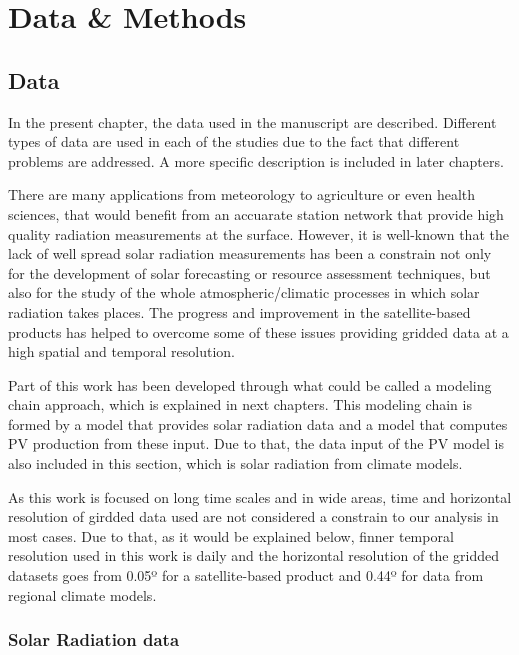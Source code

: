 \part{Data \& Methods\label{cha:datamethods}}

  
\chapter{Data\label{cha:Data}}

  In the present chapter, the data used in the manuscript are described. Different types of data are used in each of the studies due to the fact that different problems are addressed. A more specific description is included in later chapters.

  There are many applications from meteorology to agriculture or even health sciences, that would benefit from an accuarate station network that provide high quality radiation measurements at the surface. However, it is well-known that the lack of  well spread solar radiation measurements has been a constrain not only for the development of solar forecasting or resource assessment techniques, but also for the study of the whole atmospheric/climatic processes in which solar radiation takes places. The progress and improvement in the satellite-based products has helped to overcome some of these issues providing gridded data at a high spatial and temporal resolution.

  Part of this work has been developed through what could be called a modeling chain approach, which is explained in next chapters. This modeling chain is formed by a model that provides solar radiation data and a model that computes PV production from these input. Due to that, the data input of the PV model is also included in this section, which is solar radiation from climate models.

As this work is focused on long time scales and in wide areas, time and horizontal resolution of girdded data used are not considered a constrain to our analysis in most cases. Due to that, as it would be explained below, finner temporal resolution used in this work is daily and the horizontal resolution of the gridded datasets goes from 0.05º for a satellite-based product and 0.44º for data from regional climate models.    
\section{Solar Radiation data}

